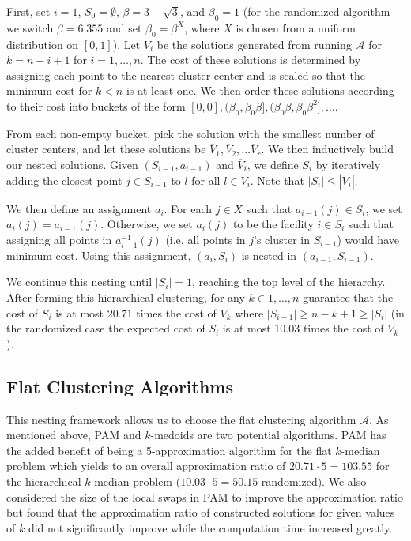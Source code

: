 \documentclass[conference, 10pt, final]{IEEEtran}
\begin{document}
First, set $i=1$, $S_0 = \emptyset$, $\beta = 3+\sqrt{3}$, and $\beta_0 = 1$ (for the randomized algorithm we switch $\beta = 6.355$ and set $\beta_0 = \beta^X$, where $X$ is chosen from a uniform distribution on $[0,1]$). Let $V_i$ be the solutions generated from running $\mathcal{A}$ for $k=n-i+1$ for $i=1, \ldots, n$. The cost of these solutions is determined by assigning each point to the nearest cluster center and is scaled so that the minimum cost for $k<n$ is at least one. We then order these solutions according to their cost into buckets of the form $[0,0], (\beta_0, \beta_0 \beta], (\beta_0 \beta, \beta_0 \beta^2], \ldots $. 

From each non-empty bucket, pick the solution with the smallest number of cluster centers, and let these solutions be $\overline{V}_1, \overline{V}_2, \ldots \overline{V}_r$. We then inductively build our nested solutions. Given $(S_{i-1}, a_{i-1})$ and $\overline{V}_i$, we define $S_i$ by iteratively adding the closest point $j \in S_{i-1}$ to $l$ for all $l \in \overline{V}_i$. Note that $|S_{i}| \leq |\overline{V}_i|$. 

We then define an assignment $a_i$. For each $j \in X$ such that $a_{i-1}(j) \in S_{i}$, we set $a_i(j) = a_{i-1}(j)$. Otherwise, we set $a_i(j)$ to be the facility $i \in S_i$ such that assigning all points in $a_{i-1}^{-1}(j)$ (i.e. all points in $j$'s cluster in $S_{i-1}$) would have minimum cost. Using this assignment, $(a_i, S_i)$ is nested in $(a_{i-1}, S_{i-1})$. 

We continue this nesting until $|S_i| = 1$, reaching the top level of the hierarchy. After forming this hierarchical clustering, for any $k \in 1, \ldots, n$ \cite{Lin} guarantee that the cost of $S_i$ is at most $20.71$ times the cost of $V_k$ where $|S_{i-1}| \geq n-k+1 \geq |S_{i}|$ (in the randomized case the expected cost of $S_i$ is at most $10.03$ times the cost of $V_k$).

\subsection{Flat Clustering Algorithms}
This nesting framework allows us to choose the flat clustering algorithm $\mathcal{A}$. As mentioned above, PAM and $k$-medoids are two potential algorithms. PAM has the added benefit of being a 5-approximation algorithm for the flat $k$-median problem which yields to an overall approximation ratio of $20.71 \cdot 5 = 103.55$ for the hierarchical $k$-median problem ($10.03 \cdot 5 = 50.15$ randomized). We also considered the size of the local swaps in PAM to improve the approximation ratio but found that the approximation ratio of constructed solutions for given values of $k$ did not significantly improve while the computation time increased greatly. 
\end{document}
